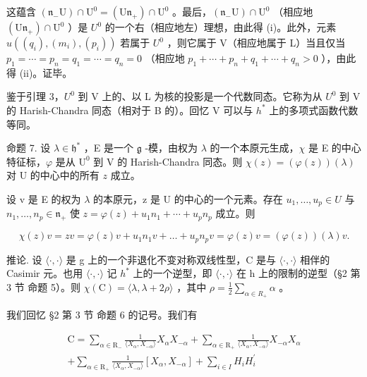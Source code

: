 这蕴含 \((\mathfrak{n}_{-}\mathrm{U})\cap\mathrm{U}^{0}=(\mathrm{U}\mathfrak{n}_{+})\cap\mathrm{U}^{0}\) 。最后，\((\mathfrak{n}_{-}\mathrm{U})\cap\mathrm{U}^{0}\) （相应地 \((\mathrm{U}\mathfrak{n}_{+})\cap\mathrm{U}^{0}\) ）是 \(U^{0}\) 的一个右（相应地左）理想，由此得 (i)。此外，元素 \(u((q_{i}),(m_{i}),(p_{i}))\) 若属于 \(U^{0}\) ，则它属于 V（相应地属于 L）当且仅当 \(p_{1}=\cdots=p_{n}=q_{1}=\cdots=q_{n}=0\) （相应地 \(p_{1}+\cdots+p_{n}+q_{1}+\cdots+q_{n}>0\) ），由此得 (ii)。证毕。

鉴于引理 3，\(U^{0}\) 到 V 上的、以 L 为核的投影是一个代数同态。它称为从 \(U^{0}\) 到 V 的 Harish-Chandra 同态（相对于 B 的）。回忆 V 可以与 \(h^{*}\) 上的多项式函数代数等同。

命题 7. 设 \(\lambda \in \mathfrak{h}^*\) ，E 是一个 \(\mathfrak{g}\) -模，由权为 \(\lambda\) 的一个本原元生成，\(\chi\) 是 E 的中心特征标，\(\varphi\) 是从 \(\mathrm{U}^0\) 到 V 的 Harish-Chandra 同态。则 \(\chi(z) = (\varphi(z))(\lambda)\) 对 U 的中心中的所有 \(z\) 成立。

设 v 是 E 的权为 \(\lambda\) 的本原元，z 是 U 的中心的一个元素。存在 \(u_{1},\ldots,u_{p}\in U\) 与 \(n_{1},\ldots,n_{p}\in\mathfrak{n}_{+}\) 使 \(z=\varphi(z)+u_{1}n_{1}+\cdots+u_{p}n_{p}\) 成立。则

\[
\chi (z) v = z v = \varphi (z) v + u _ {1} n _ {1} v + \dots + u _ {p} n _ {p} v = \varphi (z) v = (\varphi (z)) (\lambda) v.
\]

推论. 设 \(\langle\cdot,\cdot\rangle\) 是 g 上的一个非退化不变对称双线性型，C 是与 \(\langle\cdot,\cdot\rangle\) 相伴的 Casimir 元。也用 \(\langle\cdot,\cdot\rangle\) 记 \(h^{*}\) 上的一个逆型，即 \(\langle\cdot,\cdot\rangle\) 在 h 上的限制的逆型（§2 第 3 节 命题 5）。则 \(\chi(\mathrm{C})=\langle\lambda,\lambda+2\rho\rangle\) ，其中 \(\rho=\frac{1}{2}\sum_{\alpha\in R_{+}}\alpha\) 。

我们回忆 §2 第 3 节 命题 6 的记号。我们有

\[
\begin{array}{r} \mathrm{C} = \sum_ {\alpha \in \mathrm{R} _ {-}} \frac {1}{\langle X _ {\alpha} , X _ {- \alpha} \rangle} X _ {\alpha} X _ {- \alpha} + \sum_ {\alpha \in \mathrm{R} _ {+}} \frac {1}{\langle X _ {\alpha} , X _ {- \alpha} \rangle} X _ {- \alpha} X _ {\alpha} \\ + \sum_ {\alpha \in \mathrm{R} _ {+}} \frac {1}{\langle X _ {\alpha} , X _ {- \alpha} \rangle} [ X _ {\alpha}, X _ {- \alpha} ] + \sum_ {i \in I} H _ {i} H _ {i} ^ {\prime} \end{array}
\]

